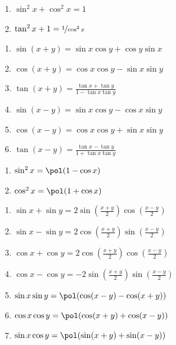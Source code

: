 \begin{enumerate}
\item $\sin^2 x + \cos^2 x = 1$
\item $\tan^2 x + 1 = \nicefrac{1}{\cos^2 x}$
\end{enumerate}

\begin{enumerate}[resume]
\item $\sin(x+y) = \sin x \cos y + \cos y \sin x$
\item $\cos(x+y) = \cos x \cos y - \sin x \sin y$
\item $\tan(x+y) = \frac{\tan x + \tan y}{1 - \tan x \tan y}$
\item $\sin(x-y) = \sin x \cos y - \cos x \sin y$
\item $\cos(x-y) = \cos x \cos y + \sin x \sin y$
\item $\tan(x-y) = \frac{\tan x - \tan y}{1 + \tan x \tan y}$
\end{enumerate}

\begin{enumerate}[resume]
\item $\sin^2 x = \pol (1 - \cos x)$
\item $\cos^2 x = \pol (1 + \cos x)$
\end{enumerate}


\begin{enumerate}[resume]
\item $\sin x + \sin y = 2 \sin(\frac{x+y}{2}) \cos(\frac{x-y}{2})$
\item $\sin x - \sin y = 2 \cos(\frac{x+y}{2}) \sin(\frac{x-y}{2})$
\item $\cos x + \cos y = 2 \cos(\frac{x+y}{2}) \cos(\frac{x-y}{2})$
\item $\cos x - \cos y = -2 \sin(\frac{x+y}{2}) \sin(\frac{x-y}{2})$
\item $\sin x \sin y = \pol (\cos(x-y) - \cos(x+y))$
\item $\cos x \cos y = \pol (\cos (x+y) + \cos(x-y))$
\item $\sin x \cos y = \pol (\sin(x+y) + \sin(x-y))$
\end{enumerate}